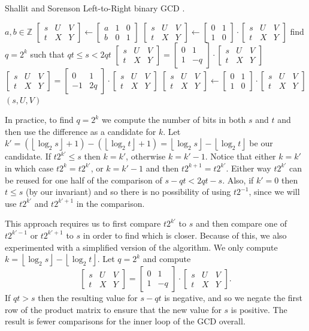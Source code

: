 \documentclass{ucalgthes1}
\theoremstyle{definition}
\newcommand{\ZZ}{\mathbb{Z}}
\newcommand{\matrixtt}[4]{\left[ \begin{array}{rr} #1 & #2 \\ #3 & #4 \end{array} \right]}
\newcommand{\matrixThreeTwo}[6]{\left[ \begin{array}{rrr} #1 & #2 & #3 \\ #4 & #5 & #6 \end{array} \right]}
\newcommand{\floor}[1]{\left\lfloor #1 \right\rfloor}
\begin{document}
\begin{algorithm}[h]
\caption{Shallit and Sorenson Left-to-Right binary GCD \cite{Shallit1994}.}
\label{alg:shallitGcd}
\begin{algorithmic}[1]
\REQUIRE $a,b \in \ZZ$
\STATE $\matrixThreeTwo{s}{U}{V}{t}{X}{Y} \gets 
        \matrixThreeTwo{a}{1}{0}{b}{0}{1}$
	\STATE $\matrixThreeTwo{s}{U}{V}{t}{X}{Y} \gets
	        \matrixtt{0}{1}{1}{0} \cdot \matrixThreeTwo{s}{U}{V}{t}{X}{Y}$
\ENDIF
{}
	\STATE find $q=2^k$ such that $qt \le s < 2qt$
		\STATE $\matrixThreeTwo{s}{U}{V}{t}{X}{Y} =
		\matrixtt{0}{1}{1}{-q} \cdot \matrixThreeTwo{s}{U}{V}{t}{X}{Y}$
	\ELSE
		\STATE $\matrixThreeTwo{s}{U}{V}{t}{X}{Y} =
		\matrixtt{0}{1}{-1}{2q} \cdot \matrixThreeTwo{s}{U}{V}{t}{X}{Y}$
	\ENDIF
		\STATE $\matrixThreeTwo{s}{U}{V}{t}{X}{Y} \gets
	    	    \matrixtt{0}{1}{1}{0} \cdot \matrixThreeTwo{s}{U}{V}{t}{X}{Y}$
	\ENDIF
\ENDWHILE
\RETURN $(s, U, V)$
\end{algorithmic}
\end{algorithm}
In practice, to find $q=2^k$ we compute the number of bits in both $s$ and $t$ and then use the difference as a candidate for $k$.  Let $k' = (\floor{\log_2s} + 1) - (\floor{\log_2t}+1) = \floor{\log_2s} - \floor{\log_2t}$ be our candidate.  If $t2^{k'} \le s$ then $k = k'$, otherwise $k = k'-1$.  Notice that either $k=k'$ in which case $t2^k=t2^{k'}$, or $k=k'-1$ and then $t2^{k+1} = t2^{k'}$.  Either way $t2^{k'}$ can be reused for one half of the comparison of $s-qt < 2qt - s$.  Also, if $k' = 0$ then $t \le s$ (by our invariant) and so there is no possibility of using $t2^{-1}$, since we will use $t2^{k'}$ and $t2^{k'+1}$ in the comparison.

This approach requires us to first compare $t2^{k'}$ to $s$ and then compare one of $t2^{k'-1}$ or $t2^{k'+1}$ to $s$ in order to find which is closer.  Because of this, we also experimented with a simplified version of the algorithm.  We only compute $k = \floor{\log_2s}-\floor{\log_2t}$.  Let $q=2^k$ and compute
\[
	\matrixThreeTwo{s}{U}{V}{t}{X}{Y} =
		\matrixtt{0}{1}{1}{-q} \cdot \matrixThreeTwo{s}{U}{V}{t}{X}{Y}.
\]
If $qt > s$ then the resulting value for $s-qt$ is negative, and so we negate the first row of the product matrix to ensure that the new value for $s$ is positive.  The result is fewer comparisons for the inner loop of the GCD overall.
\end{document}
